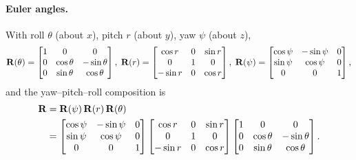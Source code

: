\paragraph{Euler angles.}
With roll $\theta$ (about $x$), pitch $r$ (about $y$), yaw $\psi$ (about $z$),
\begin{align}
\boldsymbol{\mathbf{R}}(\theta) = \begin{bmatrix} 1 & 0 & 0 \\ 0 & \cos\theta & -\sin\theta \\ 0 & \sin\theta & \cos\theta \end{bmatrix},\;
\boldsymbol{\mathbf{R}}(r) = \begin{bmatrix} \cos r & 0 & \sin r \\ 0 & 1 & 0 \\ -\sin r & 0 & \cos r \end{bmatrix},\;
\boldsymbol{\mathbf{R}}(\psi) = \begin{bmatrix} \cos\psi & -\sin\psi & 0 \\ \sin\psi & \cos\psi & 0 \\ 0 & 0 & 1 \end{bmatrix},
\end{align}
and the yaw--pitch--roll composition is
\begin{align}
\boldsymbol{\mathbf{R}} &= \boldsymbol{\mathbf{R}}(\psi)\,\boldsymbol{\mathbf{R}}(r)\,\boldsymbol{\mathbf{R}}(\theta) \\
&= \begin{bmatrix} \cos\psi & -\sin\psi & 0 \\ \sin\psi & \cos\psi & 0 \\ 0 & 0 & 1 \end{bmatrix}
\begin{bmatrix} \cos r & 0 & \sin r \\ 0 & 1 & 0 \\ -\sin r & 0 & \cos r \end{bmatrix}
\begin{bmatrix} 1 & 0 & 0 \\ 0 & \cos\theta & -\sin\theta \\ 0 & \sin\theta & \cos\theta \end{bmatrix}.
\end{align}


